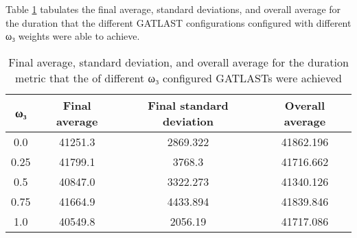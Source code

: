 Table \ref{tab:HP:GA:GWeight:duration} tabulates the final average, standard deviations, and overall average for the duration that the different GATLAST configurations configured with different ω₃ weights were able to achieve.
\begin{table}[tbh!]
\centering
\begin{adjustbox}{trim=0cm 0cm 0cm 0cm, clip=true}
\begin{tabular}{|c|c|c|c|}
\hline
ω₃ & Final average & Final standard deviation & Overall average\\
\hline
0.0 & 41251.3 & 2869.322 & 41862.196\\\hline
0.25 & 41799.1 & 3768.3 & 41716.662\\\hline
0.5 & 40847.0 & 3322.273 & 41340.126\\\hline
0.75 & 41664.9 & 4433.894 & 41839.846\\\hline
1.0 & 40549.8 & 2056.19 & 41717.086\\\hline
\end{tabular}
\end{adjustbox}
\caption{Final average, standard deviation, and overall average for the duration metric that the of different ω₃ configured GATLASTs were achieved}
\label{tab:HP:GA:GWeight:duration}
\end{table}